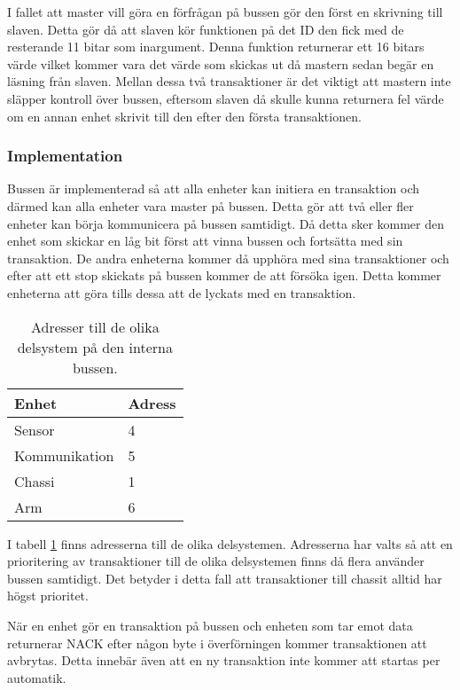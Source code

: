 I fallet att master vill göra en förfrågan på bussen gör den först en skrivning till slaven. Detta gör då att slaven kör funktionen på det ID den fick med de resterande 11 bitar som inargument. Denna funktion returnerar ett 16 bitars värde vilket kommer vara det värde som skickas ut då mastern sedan begär en läsning från slaven. Mellan dessa två transaktioner är det viktigt att mastern inte släpper kontroll över bussen, eftersom slaven då skulle kunna returnera fel värde om en annan enhet skrivit till den efter den första transaktionen.

\subsubsection{Implementation}
\label{sec:bus-implementation}
Bussen är implementerad så att alla enheter kan initiera en transaktion och därmed kan alla enheter vara master på bussen. Detta gör att två eller fler enheter kan börja kommunicera på bussen samtidigt. Då detta sker kommer den enhet som skickar en låg bit först att vinna bussen och fortsätta med sin transaktion. De andra enheterna kommer då upphöra med sina transaktioner och efter att ett stop skickats på bussen kommer de att försöka igen. Detta kommer enheterna att göra tills dessa att de lyckats med en transaktion.

\begin{table}[H]
\centering
\begin{tabularx}{0.5\textwidth}{|X|X|}
\hline
\textbf{Enhet} & \textbf{Adress} \\ \hline
Sensor & 4 \\ \hline
Kommunikation & 5 \\ \hline
Chassi & 1 \\ \hline
Arm & 6 \\ \hline
\end{tabularx}
\caption{Adresser till de olika delsystem på den interna bussen.}
\label{tab:adress-buss}
\end{table}

I tabell \ref{tab:adress-buss} finns adresserna till de olika delsystemen. Adresserna har valts så att en prioritering av transaktioner till de olika delsystemen finns då flera använder bussen samtidigt. Det betyder i detta fall att transaktioner till chassit alltid har högst prioritet.

När en enhet gör en transaktion på bussen och enheten som tar emot data returnerar NACK efter någon byte i överförningen kommer transaktionen att avbrytas. Detta innebär även att en ny transaktion inte kommer att startas per automatik.

